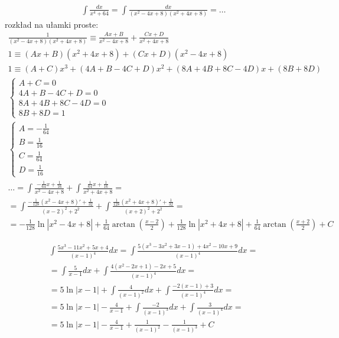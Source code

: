 
\begin{gather*}\int \frac{dx}{x^4+64}=\int \frac{dx}{(x^2-4x+8)(x^2+4x+8)}=\ldots\end{gather*}
rozkład na ułamki proste:
\begin{gather*}\frac{1}{(x^2-4x+8)(x^2+4x+8)} \equiv \frac{Ax+B}{x^2-4x+8}+\frac{Cx+D}{x^2+4x+8} \\
1 \equiv (Ax+B)(x^2+4x+8)+(Cx+D)(x^2-4x+8) \\
1 \equiv (A+C)x^3+(4A+B-4C+D)x^2+(8A+4B+8C-4D)x+(8B+8D) \\
\begin{cases} A+C=0 \\ 4A+B-4C+D=0 \\ 8A+4B+8C-4D=0 \\ 8B+8D=1 \end{cases} \\
\begin{cases} A=-\frac{1}{64} \\ B=\frac{1}{16} \\ C=\frac{1}{64} \\ D=\frac{1}{16} \end{cases} \\
\ldots = \int\frac{-\frac{1}{64}x+\frac{1}{16}}{x^2-4x+8} +\int\frac{\frac{1}{64}x+\frac{1}{16}}{x^2+4x+8} = \\
= \int\frac{-\frac{1}{128}(x^2-4x+8)'+\frac{1}{32}}{(x-2)^2+2^2} +\int\frac{\frac{1}{128}(x^2+4x+8)'+\frac{1}{32}}{(x+2)^2+2^2} = \\
= -\frac{1}{128}\ln|x^2-4x+8|+\frac{1}{64}\arctan \left( \frac{x-2}{2} \right) + \frac{1}{128}\ln|x^2+4x+8|+\frac{1}{64}\arctan \left( \frac{x+2}{2} \right)+C \end{gather*}



\begin{gather*}\int \frac{5x^3-11x^2+5x+4}{(x-1)^4}dx=\int \frac{5(x^3-3x^2+3x-1)+4x^2-10x+9}{(x-1)^4}dx = \\
= \int \frac{5}{x-1}dx + \int \frac{4(x^2-2x+1)-2x+5}{(x-1)^4}dx = \\
= 5\ln|x-1|+\int \frac{4}{(x-1)^2}dx + \int \frac{-2(x-1)+3}{(x-1)^4}dx = \\
= 5\ln|x-1|-\frac{4}{x-1} +\int \frac{-2}{(x-1)^3}dx + \int \frac{3}{(x-1)^4}dx = \\
= 5\ln|x-1|-\frac{4}{x-1} + \frac{1}{(x-1)^2} - \frac{1}{(x-1)^3}+C\end{gather*}


